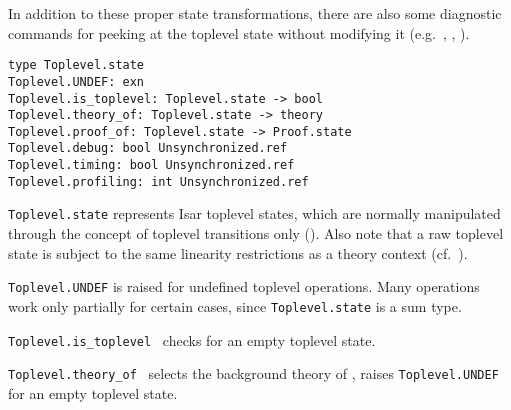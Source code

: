 \begin{isabellebody}
\begin{isamarkuptext}
  In addition to these proper state transformations, there are also
  some diagnostic commands for peeking at the toplevel state without
  modifying it (e.g.\ , ,
  ).%
\end{isamarkuptext}%
\isamarkuptrue%
%
\isadelimmlref
%
\endisadelimmlref
%
\isatagmlref
%
\begin{isamarkuptext}%
\begin{mldecls}
  \verb|type Toplevel.state| \\
  \verb|Toplevel.UNDEF: exn| \\
  \verb|Toplevel.is_toplevel: Toplevel.state -> bool| \\
  \verb|Toplevel.theory_of: Toplevel.state -> theory| \\
  \verb|Toplevel.proof_of: Toplevel.state -> Proof.state| \\
  \verb|Toplevel.debug: bool Unsynchronized.ref| \\
  \verb|Toplevel.timing: bool Unsynchronized.ref| \\
  \verb|Toplevel.profiling: int Unsynchronized.ref| \\
  \end{mldecls}

  \begin{description}

  \item \verb|Toplevel.state| represents Isar toplevel states,
  which are normally manipulated through the concept of toplevel
  transitions only ().  Also note that
  a raw toplevel state is subject to the same linearity restrictions
  as a theory context (cf.~).

  \item \verb|Toplevel.UNDEF| is raised for undefined toplevel
  operations.  Many operations work only partially for certain cases,
  since \verb|Toplevel.state| is a sum type.

  \item \verb|Toplevel.is_toplevel|~ checks for an empty
  toplevel state.

  \item \verb|Toplevel.theory_of|~ selects the
  background theory of , raises \verb|Toplevel.UNDEF|
  for an empty toplevel state.


\end{description}
\end{isamarkuptext}
\end{isabellebody}
